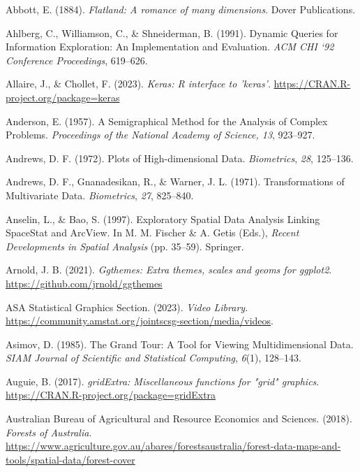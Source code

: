 \documentclass[
  letterpaper,
]{krantz}
\newlength{\cslhangindent}
\newenvironment{CSLReferences}[2] %
 {\begin{list}{}{%
  \setlength{\itemindent}{0pt}
  \setlength{\leftmargin}{0pt}
  \setlength{\parsep}{0pt}
  \ifodd #1
   \setlength{\leftmargin}{\cslhangindent}
   \setlength{\itemindent}{-1\cslhangindent}
  \fi
  \setlength{\itemsep}{#2\baselineskip}}}
 {\end{list}}
\begin{document}
\label{refs}
\begin{CSLReferences}{1}{0}
Abbott, E. (1884). \emph{Flatland: A romance of many dimensions}. Dover
Publications.

Ahlberg, C., Williamson, C., \& Shneiderman, B. (1991). Dynamic
{Q}ueries for {I}nformation {E}xploration: {A}n {I}mplementation and
{E}valuation. \emph{ACM CHI `92 Conference Proceedings}, 619--626.

Allaire, J., \& Chollet, F. (2023). \emph{Keras: R interface to
'keras'}. \url{https://CRAN.R-project.org/package=keras}

Anderson, E. (1957). A {S}emigraphical {M}ethod for the {A}nalysis of
{C}omplex {P}roblems. \emph{Proceedings of the National Academy of
Science, 13}, 923--927.

Andrews, D. F. (1972). {P}lots of {H}igh-dimensional {D}ata.
\emph{Biometrics}, \emph{28}, 125--136.

Andrews, D. F., Gnanadesikan, R., \& Warner, J. L. (1971).
{T}ransformations of {M}ultivariate {D}ata. \emph{Biometrics},
\emph{27}, 825--840.

Anselin, L., \& Bao, S. (1997). {E}xploratory {S}patial {D}ata
{A}nalysis {L}inking {S}pace{S}tat and {A}rc{V}iew. In M. M. Fischer \&
A. Getis (Eds.), \emph{{R}ecent {D}evelopments in {S}patial {A}nalysis}
(pp. 35--59). Springer.

Arnold, J. B. (2021). \emph{Ggthemes: Extra themes, scales and geoms for
ggplot2}. \url{https://github.com/jrnold/ggthemes}

ASA Statistical Graphics Section. (2023). \emph{Video {L}ibrary}.
\url{https://community.amstat.org/jointscsg-section/media/videos}.

Asimov, D. (1985). {T}he {G}rand {T}our: {A} {T}ool for {V}iewing
{M}ultidimensional {D}ata. \emph{SIAM Journal of Scientific and
Statistical Computing}, \emph{6}(1), 128--143.

Auguie, B. (2017). \emph{gridExtra: Miscellaneous functions for "grid"
graphics}. \url{https://CRAN.R-project.org/package=gridExtra}

Australian Bureau of Agricultural and Resource Economics and Sciences.
(2018). \emph{{Forests of Australia}}.
\url{https://www.agriculture.gov.au/abares/forestsaustralia/forest-data-maps-and-tools/spatial-data/forest-cover}


\end{CSLReferences}
\end{document}
